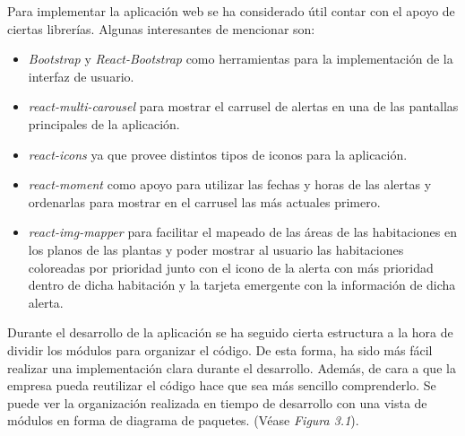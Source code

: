 Para implementar la aplicación web se ha considerado útil contar con el apoyo de ciertas librerías. Algunas interesantes de mencionar son:
\begin{itemize}
	\item \textit{Bootstrap} \cite{bootstrap} y \textit{React-Bootstrap} \cite{react-bootstrap} como herramientas para la implementación de la interfaz de usuario.
	\item \textit{react-multi-carousel} \cite{react-multi-carousel} para mostrar el carrusel de alertas en una de las pantallas principales de la aplicación.
	\item \textit{react-icons} \cite{react-icons} ya que provee distintos tipos de iconos para la aplicación.
	\item \textit{react-moment} \cite{react-moment} como apoyo para utilizar las fechas y horas de las alertas y ordenarlas para mostrar en el carrusel las más actuales primero.
	\item \textit{react-img-mapper} \cite{react-img-mapper} para facilitar el mapeado de las áreas de las habitaciones en los planos de las plantas y poder mostrar al usuario las habitaciones coloreadas por prioridad junto con el icono de la alerta con más prioridad dentro de dicha habitación y la tarjeta emergente con la información de dicha alerta.
\end{itemize}


Durante el desarrollo de la aplicación se ha seguido cierta estructura a la hora de dividir los módulos para organizar el código. De esta forma, ha sido más fácil realizar una implementación clara durante el desarrollo. Además, de cara a que la empresa pueda reutilizar el código hace que sea más sencillo comprenderlo. Se puede ver la organización realizada  en tiempo de desarrollo con una vista de módulos en forma de diagrama de paquetes. (Véase \textit{Figura 3.1}).\\

